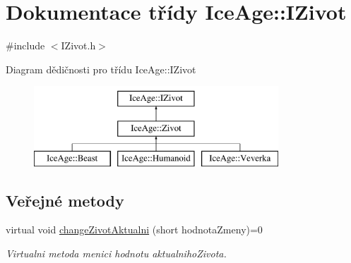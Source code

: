 \hypertarget{classIceAge_1_1IZivot}{}\section{Dokumentace třídy Ice\+Age\+:\+:I\+Zivot}
\label{classIceAge_1_1IZivot}


{\ttfamily \#include $<$I\+Zivot.\+h$>$}

Diagram dědičnosti pro třídu Ice\+Age\+:\+:I\+Zivot\begin{figure}[H]
\begin{center}
\leavevmode
\includegraphics[height=3.000000cm]{df/d67/classIceAge_1_1IZivot}
\end{center}
\end{figure}
\subsection*{Veřejné metody}
\begin{DoxyCompactItemize}
\item 
virtual void \hyperlink{classIceAge_1_1IZivot_a01f6798ca546ceece0d707bc85076d9c}{change\+Zivot\+Aktualni} (short hodnota\+Zmeny)=0
\begin{DoxyCompactList}\small\item\em Virtualni metoda menici hodnotu aktualniho\+Zivota. \end{DoxyCompactList}\end{DoxyCompactItemize}
